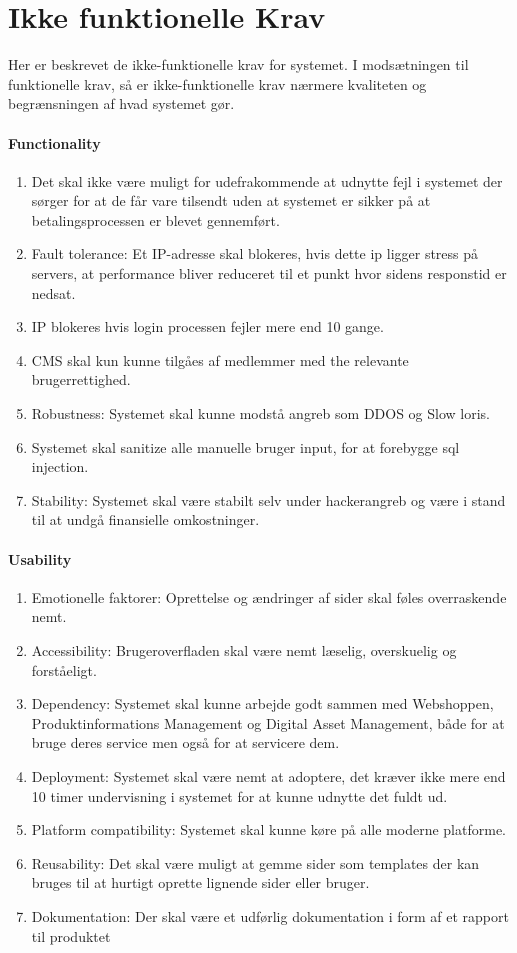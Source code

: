 \section{Ikke funktionelle Krav}
Her er beskrevet de ikke-funktionelle krav for systemet. I modsætningen til funktionelle krav, så er ikke-funktionelle krav nærmere kvaliteten og begrænsningen af hvad systemet gør.

\paragraph{Functionality}
	\begin{enumerate}
	\item Det skal ikke være muligt for udefrakommende at udnytte fejl i systemet der sørger for at de får vare tilsendt uden at systemet er sikker på at betalingsprocessen er blevet gennemført.
    \item Fault tolerance: Et IP-adresse skal blokeres, hvis dette ip ligger stress på servers, at performance bliver reduceret til et punkt hvor sidens responstid er nedsat.
    \item IP blokeres hvis login processen fejler mere end 10 gange.
    \item CMS skal kun kunne tilgåes af medlemmer med the relevante brugerrettighed.
    \item Robustness: Systemet skal kunne modstå angreb som DDOS og Slow loris.
    \item Systemet skal sanitize alle manuelle bruger input, for at forebygge sql injection.
    \item Stability: Systemet skal være stabilt selv under hackerangreb og være i stand til at undgå finansielle omkostninger.
	\end{enumerate}
    
\paragraph{Usability}
	\begin{enumerate}
	\item Emotionelle faktorer: Oprettelse og ændringer af sider skal føles overraskende nemt.
    \item Accessibility: Brugeroverfladen skal være nemt læselig, overskuelig og forståeligt.
    \item Dependency: Systemet skal kunne arbejde godt sammen med Webshoppen, Produktinformations Management og Digital Asset Management, både for at bruge deres service men også for at servicere dem.
    \item Deployment: Systemet skal være nemt at adoptere, det kræver ikke mere end 10 timer undervisning i systemet for at kunne udnytte det fuldt ud.
    \item Platform compatibility: Systemet skal kunne køre på alle moderne platforme.
    \item Reusability: Det skal være muligt at gemme sider som templates der kan bruges til at hurtigt oprette lignende sider eller bruger.
    \item Dokumentation: Der skal være et udførlig dokumentation i form af et rapport til produktet
	\end{enumerate}
    

